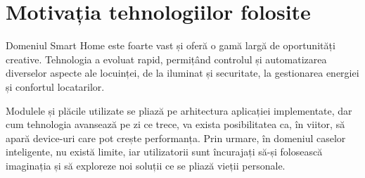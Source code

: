 \section{Motivația tehnologiilor folosite}

Domeniul Smart Home este foarte vast și oferă o gamă largă de oportunități creative. Tehnologia a evoluat rapid, permițând controlul și automatizarea diverselor aspecte ale locuinței, de la iluminat și securitate, la gestionarea energiei și confortul locatarilor. 

Modulele și plăcile utilizate se pliază pe arhitectura aplicației implementate, dar cum tehnologia avansează pe zi ce trece, va exista posibilitatea ca, în viitor, să apară device-uri care pot crește performanța. Prin urmare, în domeniul caselor inteligente, nu există limite, iar utilizatorii sunt încurajați să-și folosească imaginația și să exploreze noi soluții ce se pliază vieții personale.